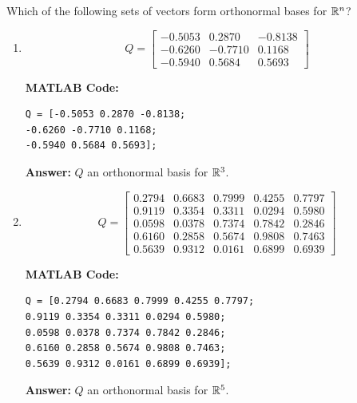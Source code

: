 \documentclass{ximera}
\begin{document}
\begin{example}
Which of the following sets of vectors form orthonormal bases for $\mathbb{R}^n$?

\begin{enumerate}

    \item \[
Q = \begin{bmatrix} 
-0.5053 & 0.2870 & -0.8138 \\ 
-0.6260 & -0.7710 & 0.1168 \\ 
-0.5940 & 0.5684 & 0.5693 
\end{bmatrix}
\]

\textbf{MATLAB Code:}
\begin{verbatim}
Q = [-0.5053 0.2870 -0.8138;
-0.6260 -0.7710 0.1168;
-0.5940 0.5684 0.5693];
\end{verbatim}

\textbf{Answer:}
$Q$  an orthonormal basis for $\mathbb{R}^3$.


\item \[
Q = \begin{bmatrix} 
0.2794 & 0.6683 & 0.7999 & 0.4255 & 0.7797 \\
0.9119 & 0.3354 & 0.3311 & 0.0294 & 0.5980 \\
0.0598 & 0.0378 & 0.7374 & 0.7842 & 0.2846 \\
0.6160 & 0.2858 & 0.5674 & 0.9808 & 0.7463 \\
0.5639 & 0.9312 & 0.0161 & 0.6899 & 0.6939
\end{bmatrix}
\]

\textbf{MATLAB Code:}
\begin{verbatim}
Q = [0.2794 0.6683 0.7999 0.4255 0.7797;
0.9119 0.3354 0.3311 0.0294 0.5980;
0.0598 0.0378 0.7374 0.7842 0.2846;
0.6160 0.2858 0.5674 0.9808 0.7463;
0.5639 0.9312 0.0161 0.6899 0.6939];
\end{verbatim}

\textbf{Answer:}
$Q$  an orthonormal basis for $\mathbb{R}^5$.


\end{enumerate}
\end{example}
\end{document}
